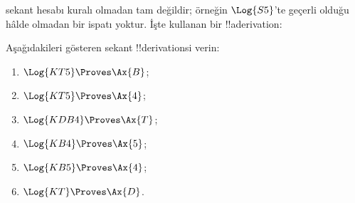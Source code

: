 \documentclass[../../../include/open-logic-section]{subfiles}
\begin{document}
\begin{ex}
 sekant hesabı \Cut{} kuralı olmadan tam değildir; örneğin
$\Log{S5}$'te geçerli olduğu hâlde \Cut{} olmadan bir ispatı yoktur.
İşte \Cut{} kullanan bir !!a{derivation}:
\begin{prooftree}
\end{prooftree}
\end{ex}

\begin{prob}
Aşağıdakileri gösteren sekant !!{derivation}s{}i verin:
  \begin{enumerate}
  \item $\Log{KT5} \Proves \Ax{B}$;
  \item $\Log{KT5} \Proves \Ax{4}$;
  \item $\Log{KDB4} \Proves \Ax{T}$;
  \item $\Log{KB4} \Proves \Ax{5}$;
  \item $\Log{KB5} \Proves \Ax{4}$;
  \item $\Log{KT} \Proves \Ax{D}$.
  \end{enumerate}
\end{prob}
\end{document}
